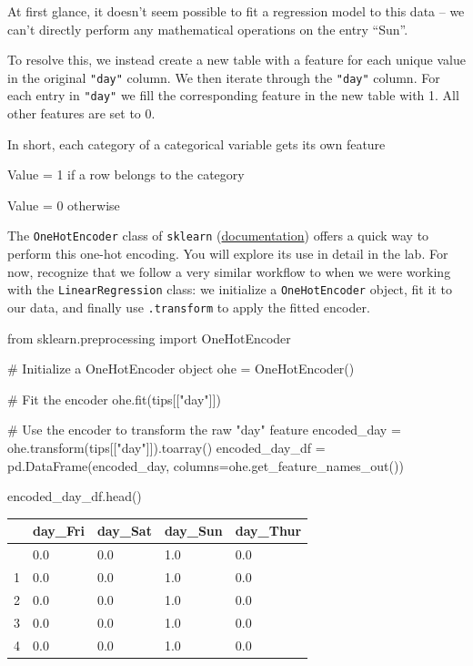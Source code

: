 \documentclass[
  letterpaper,
  DIV=11,
  numbers=noendperiod]{scrreprt}
\newenvironment{Shaded}{\begin{snugshade}}{\end{snugshade}}
\newcommand{\CommentTok}[1]{\textcolor[rgb]{0.37,0.37,0.37}{#1}}
\newcommand{\ImportTok}[1]{\textcolor[rgb]{0.00,0.46,0.62}{#1}}
\newcommand{\NormalTok}[1]{\textcolor[rgb]{0.00,0.23,0.31}{#1}}
\newcommand{\OperatorTok}[1]{\textcolor[rgb]{0.37,0.37,0.37}{#1}}
\newcommand{\StringTok}[1]{\textcolor[rgb]{0.13,0.47,0.30}{#1}}
\begin{document}
At first glance, it doesn't seem possible to fit a regression model to
this data -- we can't directly perform any mathematical operations on
the entry ``Sun''.

To resolve this, we instead create a new table with a feature for each
unique value in the original \texttt{"day"} column. We then iterate
through the \texttt{"day"} column. For each entry in \texttt{"day"} we
fill the corresponding feature in the new table with 1. All other
features are set to 0.

In short, each category of a categorical variable gets its own feature

Value = 1 if a row belongs to the category

Value = 0 otherwise

The \texttt{OneHotEncoder} class of \texttt{sklearn}
(\href{https://scikit-learn.org/stable/modules/generated/sklearn.preprocessing.OneHotEncoder.html\#sklearn.preprocessing.OneHotEncoder.get_feature_names_out}{documentation})
offers a quick way to perform this one-hot encoding. You will explore
its use in detail in the lab. For now, recognize that we follow a very
similar workflow to when we were working with the
\texttt{LinearRegression} class: we initialize a \texttt{OneHotEncoder}
object, fit it to our data, and finally use \texttt{.transform} to apply
the fitted encoder.

\begin{Shaded}
\begin{Highlighting}[]
\ImportTok{from}\NormalTok{ sklearn.preprocessing }\ImportTok{import}\NormalTok{ OneHotEncoder}

\CommentTok{\# Initialize a OneHotEncoder object}
\NormalTok{ohe }\OperatorTok{=}\NormalTok{ OneHotEncoder()}

\CommentTok{\# Fit the encoder}
\NormalTok{ohe.fit(tips[[}\StringTok{"day"}\NormalTok{]])}

\CommentTok{\# Use the encoder to transform the raw "day" feature}
\NormalTok{encoded\_day }\OperatorTok{=}\NormalTok{ ohe.transform(tips[[}\StringTok{"day"}\NormalTok{]]).toarray()}
\NormalTok{encoded\_day\_df }\OperatorTok{=}\NormalTok{ pd.DataFrame(encoded\_day, columns}\OperatorTok{=}\NormalTok{ohe.get\_feature\_names\_out())}

\NormalTok{encoded\_day\_df.head()}
\end{Highlighting}
\end{Shaded}

\begin{longtable}[]{@{}lllll@{}}
\toprule\noalign{}
& day\_Fri & day\_Sat & day\_Sun & day\_Thur \\
\midrule\noalign{}
\endhead
\bottomrule\noalign{}
\endlastfoot
0 & 0.0 & 0.0 & 1.0 & 0.0 \\
1 & 0.0 & 0.0 & 1.0 & 0.0 \\
2 & 0.0 & 0.0 & 1.0 & 0.0 \\
3 & 0.0 & 0.0 & 1.0 & 0.0 \\
4 & 0.0 & 0.0 & 1.0 & 0.0 \\
\end{longtable}
\end{document}
